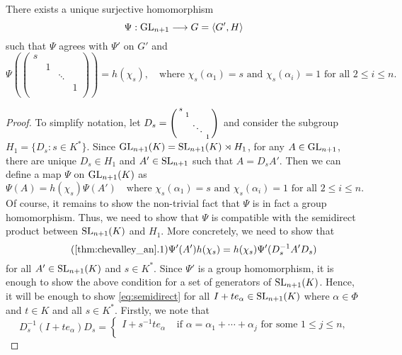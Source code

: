 \begin{theorem}\label{thm:chevalley_an}
    There exists a unique surjective homomorphism 
    $$\Psi:\GL_{n+1}\longrightarrow G=\langle G',H\rangle$$
    such that $\Psi$ agrees with $\Psi'$ on $G'$ and 
    $$\Psi\left(\begin{pmatrix}
        s &  & & \\
         & 1 & & \\
         & & \ddots & \\
         & & & 1\\
    \end{pmatrix}\right)=h(\chi_s),\quad\text{where }\chi_s(\alpha_1)=s \text{ and }\chi_s(\alpha_i)=1 \text{ for all }2\leq i\leq n.$$
\end{theorem}
\begin{proof}
    To simplify notation, let $D_s=\begin{psmallmatrix}
        s &  & & \\
         & 1 & & \\
         & & \ddots & \\
         & & & 1\\
    \end{psmallmatrix}$ and consider the subgroup $H_1=\{D_s:s\in K^*\}$. Since 
    $\GL_{n+1}(K)=\SL_{n+1}(K)\rtimes H_1$, for any $A\in\GL_{n+1}$, there are unique $D_s\in H_1$ and $A'\in\SL_{n+1}$ such that $A=D_s A'$. Then we can define a map $\Psi$ on $\GL_{n+1}(K)$ as 
    $$\Psi(A)=h(\chi_s)\Psi(A')\quad\text{where }\chi_s(\alpha_1)=s \text{ and }\chi_s(\alpha_i)=1 \text{ for all }2\leq i\leq n.$$
    Of course, it remains to show the non-trivial fact that $\Psi$ is in fact a group homomorphism. Thus, we need to show that $\Psi$ is compatible with the semidirect product between $\SL_{n+1}(K)$ and $H_1$. More concretely, we need to show that 
    \begin{equation}\tag{\ref{thm:chevalley_an}.1}\label{eq:semidirect}
        \Psi'(A')h(\chi_s)=h(\chi_s)\Psi'(D_s^{-1}A'D_s)
    \end{equation}
    for all $A'\in\SL_{n+1}(K)$ and $s\in K^*$. Since $\Psi'$ is a group homomorphism, it is enough to show the above condition for a set of generators of $\SL_{n+1}(K)$. Hence, it will be enough to show \eqref{eq:semidirect} for all $I+t e_\alpha\in\SL_{n+1}(K)$ where $\alpha\in\Phi$ and $t\in K$ and all $s\in K^*$. Firstly, we note that 
    $$D_s^{-1}(I+t e_\alpha)D_s=\begin{cases}
        I+s^{-1}t e_\alpha & \text{ if }\alpha=\alpha_1+\cdots+\alpha_j \text{ for some $1\leq j\leq n$,}\\

\end{cases}$$
\end{proof}
